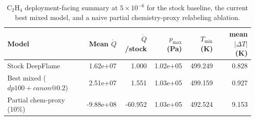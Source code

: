 \begin{table}[t]
\centering
\small
\caption{C$_2$H$_4$ deployment-facing summary at $5\times10^{-6}$ for the stock baseline, the current best mixed model, and a naive partial chemistry-proxy relabeling ablation.}
\label{tab:c2h4-runtime-summary}
\begin{tabular}{p{3.1cm}rrrrr}
\toprule
Model & Mean $\dot{Q}$ & $\dot{Q}$/stock & $p_{\max}$ (Pa) & $T_{\min}$ (K) & mean $|\Delta T|$ (K) \\
\midrule
Stock DeepFlame & 1.62e+07 & 1.000 & 1.02e+05 & 499.249 & 0.828 \\
Best mixed ($dp100+canon@0.2$) & 2.51e+07 & 1.551 & 1.03e+05 & 499.159 & 0.927 \\
Partial chem-proxy (10\%) & -9.88e+08 & -60.952 & 1.03e+05 & 492.524 & 9.153 \\
\bottomrule
\end{tabular}
\end{table}
